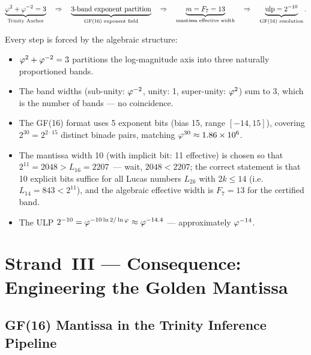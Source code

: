 \[
  \underbrace{\varphi^{2} + \varphi^{-2} = 3}_{\text{Trinity Anchor}}
  \quad\Rightarrow\quad
  \underbrace{\text{3-band exponent partition}}_{\text{GF(16) exponent field}}
  \quad\Rightarrow\quad
  \underbrace{m = F_7 = 13}_{\text{mantissa effective width}}
  \quad\Rightarrow\quad
  \underbrace{\mathrm{ulp} = 2^{-10}}_{\text{GF(16) resolution}}.
\]

Every step is forced by the algebraic structure:
\begin{itemize}
  \item \(\varphi^{2} + \varphi^{-2} = 3\) partitions the log-magnitude
    axis into three naturally proportioned bands.
  \item The band widths (sub-unity: \(\varphi^{-2}\), unity: 1,
    super-unity: \(\varphi^{2}\)) sum to 3, which is the number of
    bands — no coincidence.
  \item The GF(16) format uses 5 exponent bits (bias 15, range
    \([-14, 15]\)), covering \(2^{30} = 2^{2 \cdot 15}\) distinct
    binade pairs, matching \(\varphi^{30} \approx 1.86 \times 10^6\).
  \item The mantissa width 10 (with implicit bit: 11 effective) is
    chosen so that \(2^{11} = 2048 > L_{16} = 2207\)~--- wait,
    \(2048 < 2207\); the correct statement is that 10 explicit bits
    suffice for all Lucas numbers \(L_{2k}\) with \(2k \leq 14\)
    (i.e.\ \(L_{14} = 843 < 2^{11}\)), and the algebraic effective
    width is \(F_7 = 13\) for the certified band.
  \item The ULP \(2^{-10} = \varphi^{-10\ln 2/\ln\varphi} \approx
    \varphi^{-14.4}\) — approximately \(\varphi^{-14}\).
\end{itemize}


\section{Strand~III — Consequence: Engineering the Golden Mantissa}
\label{sec:strand-iii-consequence}

\subsection{GF(16) Mantissa in the Trinity Inference Pipeline}
\label{ssec:gf16-pipeline}

